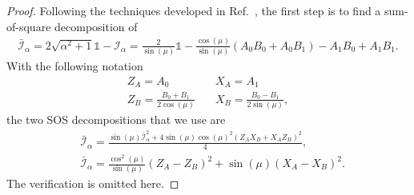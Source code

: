 \documentclass[11pt,letterpaper]{article}
\newcommand{\1}{\mathbb{1}}
\newcommand{\I}{\mathcal{I}}
\theoremstyle{definition}
\begin{document}
\begin{proof}
Following the techniques developed in Ref.~\cite{bamps2015}, the first step is to find a sum-of-square decomposition of 
\begin{align}
	\bar{\I}_\alpha = 2\sqrt{\alpha^2+1} \1 - \I_\alpha
	= \frac{2}{\sin(\mu)} \1 - \frac{\cos(\mu)}{\sin(\mu)}(A_0B_0+A_0B_1) -  A_1B_0 + A_1B_1.
\end{align} 
With the following notation
\begin{align*}
	Z_A = A_0 &\quad X_A = A_1\\
	Z_B = \frac{B_0+B_1}{2\cos(\mu)} &\quad X_B = \frac{B_0-B_1}{2\sin(\mu)},
\end{align*}
the two SOS decompositions that we use are
\begin{align}
	\label{eq:sos1}&\bar{\I}_\alpha = \frac{\sin(\mu)\bar{\I}_\alpha^2 + 4\sin(\mu)\cos(\mu)^2(Z_AX_B+X_AZ_B)^2}{4},\\
	\label{eq:sos2}&\bar{\I}_\alpha = \frac{\cos^2(\mu)}{\sin(\mu)}(Z_A-Z_B)^2 + \sin(\mu) (X_A-X_B)^2.
\end{align}
The verification is omitted here.


\end{proof}
\end{document}
